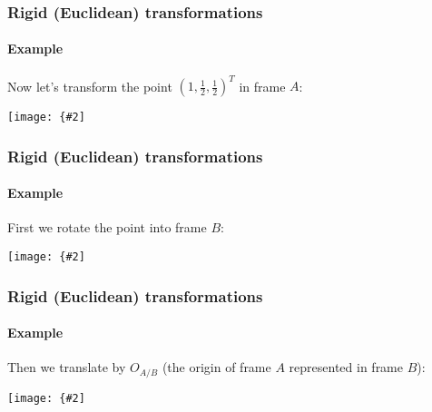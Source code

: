 \documentclass[aspectratio=169]{beamer}
\newcommand{\myfig}[3]{\centerline{\texttt{[image: \{\#2]}}}
    \centerline{\scriptsize #3}}
\begin{document}
\begin{frame}
\frametitle{Rigid (Euclidean) transformations}
\framesubtitle{Example}

Now let's transform the point $(1,\frac{1}{2},\frac{1}{2})^T$ in frame
$A$:

\myfig{2.5in}{rigid-1}{}

\end{frame}

\begin{frame}
\frametitle{Rigid (Euclidean) transformations}
\framesubtitle{Example}

First we rotate the point into frame $B$:

\myfig{2.8in}{rigid-2}{}

\end{frame}

\begin{frame}
\frametitle{Rigid (Euclidean) transformations}
\framesubtitle{Example}

Then we translate by $O_{A/B}$ (the origin of frame $A$ represented in
frame $B$):

\myfig{2.8in}{rigid-3}{}

\end{frame}
\end{document}
